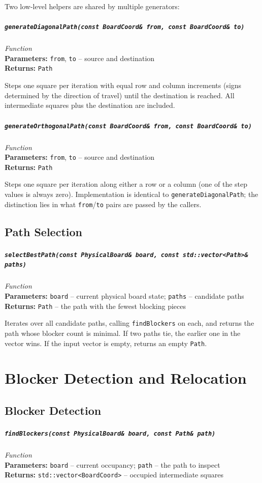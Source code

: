 \documentclass[11pt,a4paper]{report}
\newcommand{\function}[4]{%
    \paragraph{\texttt{#1}} \hfill \textit{#2}\\
    \textbf{Parameters:} #3\\
    \textbf{Returns:} #4
}
\begin{document}
Two low-level helpers are shared by multiple generators:

\function{generateDiagonalPath(const BoardCoord\& from, const BoardCoord\& to)}{Function}{\texttt{from}, \texttt{to} -- source and destination}{\texttt{Path}}

Steps one square per iteration with equal row and column increments (signs determined by the direction of travel) until the destination is reached. All intermediate squares plus the destination are included.

\function{generateOrthogonalPath(const BoardCoord\& from, const BoardCoord\& to)}{Function}{\texttt{from}, \texttt{to} -- source and destination}{\texttt{Path}}

Steps one square per iteration along either a row or a column (one of the step values is always zero). Implementation is identical to \texttt{generateDiagonalPath}; the distinction lies in what \texttt{from}/\texttt{to} pairs are passed by the callers.

\section{Path Selection}

\function{selectBestPath(const PhysicalBoard\& board, const std::vector<Path>\& paths)}{Function}{\texttt{board} -- current physical board state; \texttt{paths} -- candidate paths}{\texttt{Path} -- the path with the fewest blocking pieces}

Iterates over all candidate paths, calling \texttt{findBlockers} on each, and returns the path whose blocker count is minimal. If two paths tie, the earlier one in the vector wins. If the input vector is empty, returns an empty \texttt{Path}.

\chapter{Blocker Detection and Relocation}

\section{Blocker Detection}

\function{findBlockers(const PhysicalBoard\& board, const Path\& path)}{Function}{\texttt{board} -- current occupancy; \texttt{path} -- the path to inspect}{\texttt{std::vector<BoardCoord>} -- occupied intermediate squares}
\end{document}
